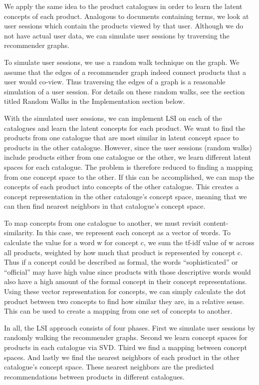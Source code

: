 \documentclass[11pt]{article}
\begin{document}
We apply the same idea to the product catalogues in order to learn the latent
concepts of each product. Analogous to documents containing terms, we look at
user sessions which contain the products viewed by that user. Although we do not
have actual user data, we can simulate user sessions by traversing the
recommender graphs. 

To simulate user sessions, we use a random walk technique on the graph. We
assume that the edges of a recommender graph indeed connect products that a user
would co-view. Thus traversing the edges of a graph is a reasonable simulation
of a user session. For details on these random walks, see the section titled
Random Walks in the Implementation section below.

With the simulated user sessions, we can implement LSI on each of the catalogues
and learn the latent concepts for each product. We want to find the products from
one catalogue that are most similar in latent concept space to products in the
other catalogue. However, since the user sessions (random walks) include
products either from one catalogue or the other, we learn different latent 
spaces for each catalogue. The problem is therefore reduced to finding a mapping
from one concept space to the other. If this can be accomplished, we
can map the concepts of each product into concepts of the other catalogue. This
creates a concept representation in the other catalouge's concept space, meaning
that we can then find nearest neighbors in that catalogue's concept space. 

To map concepts from one catalogue to another, we must revisit
content-similarity. In this case, we represent each concept as a vector of
words. To calculate the value for a word w for concept c, we sum the tf-idf
value of w across all products, weighted by how much that product is represented
by concept c. Thus if a concept could be described as formal, the words
``sophisticated'' or ``official'' may have high value since products with those
descriptive words would also have a high amount of the formal concept in their
concept representations. Using these vector representation for concepts, we can
simply calculate the dot product between two concepts to find how similar they
are, in a relative sense. This can be used to create a mapping from one set of
concepts to another.

In all, the LSI approach consists of four phases. First we simulate user
sessions by randomly walking the recommender graphs. Second we learn concept
spaces for products in each catalogue via SVD. Third we find a mapping between
concept spaces. And lastly we find the nearest neighbors of each product in the
other catalogue's concept space. These nearest neighbors are the predicted
recommendations between products in different catalogues.
\end{document}
